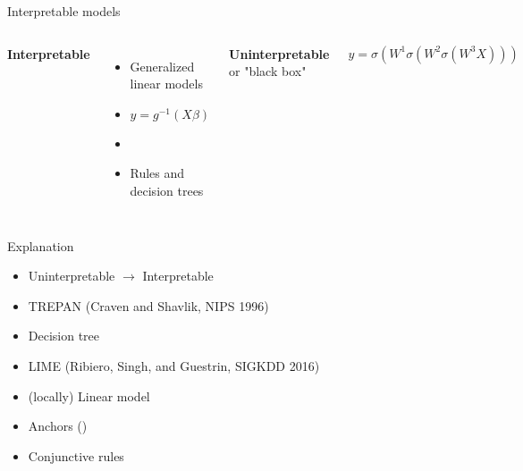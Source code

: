 \documentclass[aspectratio=169]{beamer}
\begin{document}

\begin{frame}{Interpretable models}
\begin{columns}
	\begin{center}\bf Interpretable \end{center}
	\begin{itemize}
		\item Generalized linear models
		\item[] $y = g^{-1}( X\beta )$
		\item[] %
		\item Rules and decision trees
	\end{itemize}
	
	\begin{center}\textbf{Uninterpretable} or "black box"\end{center}
	
	$y = \sigma( W^1 \sigma( W^2 \sigma( W^3 X ) ) )$
	
\end{columns}
\end{frame}
  

\begin{frame}{Explanation}
\begin{itemize}[<+->]
	\item Uninterpretable $\rightarrow$ Interpretable
	\item TREPAN (Craven and Shavlik, NIPS 1996)
	\item[] Decision tree
	\item LIME (Ribiero, Singh, and Guestrin, SIGKDD 2016)
	\item[] (locally) Linear model
	\item Anchors () %
	\item[] Conjunctive rules
\end{itemize}

\end{frame}

\end{document}

